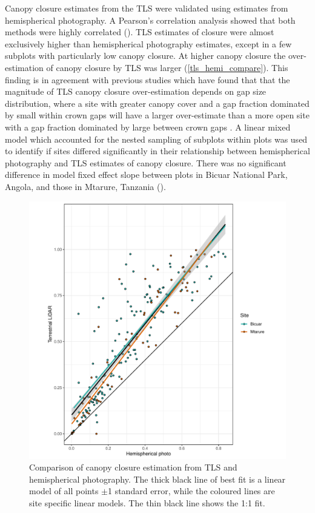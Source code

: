 \documentclass[11pt,a4paper]{article}
\begin{document}
Canopy closure estimates from the TLS were validated using estimates from hemispherical photography. A Pearson's correlation analysis showed that both methods were highly correlated (\hemiCor{}). TLS estimates of closure were almost exclusively higher than hemispherical photography estimates, except in a few subplots with particularly low canopy closure. At higher canopy closure the over-estimation of canopy closure by TLS was larger (\autoref{tls_hemi_compare}). This finding is in agreement with previous studies which have found that that the magnitude of TLS canopy closure over-estimation depends on gap size distribution, where a site with greater canopy cover and a gap fraction dominated by small within crown gaps will have a larger over-estimate than a more open site with a gap fraction dominated by large between crown gaps \citep{Seidel2012}. A linear mixed model which accounted for the nested sampling of subplots within plots was used to identify if sites differed significantly in their relationship between hemispherical photography and TLS estimates of canopy closure. There was no significant difference in model fixed effect slope between plots in Bicuar National Park, Angola, and those in Mtarure, Tanzania (\hemiLme{}). 

\begin{figure}
\centering
	\includegraphics[width=\linewidth]{tls_hemi_compare}
	\caption{Comparison of canopy closure estimation from TLS and hemispherical photography. The thick black line of best fit is a linear model of all points $\pm$1 standard error, while the coloured lines are site specific linear models. The thin black line shows the 1:1 fit.}
	\label{tls_hemi_compare}
\end{figure}
\end{document}
